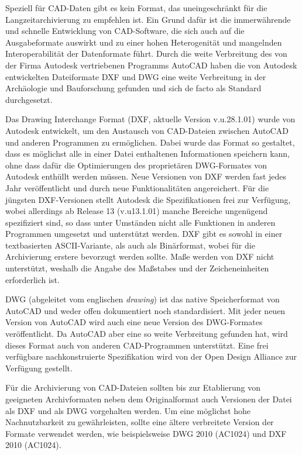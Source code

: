Speziell für CAD-Daten gibt es kein Format, das uneingeschränkt für die Langzeitarchivierung zu empfehlen ist. Ein Grund dafür ist die immerwährende und schnelle Entwicklung von CAD-Software, die sich auch auf die Ausgabeformate auswirkt und zu einer hohen Heterogenität und mangelnden Interoperabilität der Datenformate führt. Durch die weite Verbreitung des von der Firma Autodesk vertriebenen Programms AutoCAD haben die von Autodesk entwickelten Dateiformate DXF und DWG eine weite Verbreitung in der Archäologie und Bauforschung gefunden und sich de facto als Standard durchgesetzt.

Das Drawing Interchange Format (DXF, aktuelle Version v.u.28.1.01) wurde von Autodesk entwickelt, um den Austausch von CAD-Dateien zwischen AutoCAD und anderen Programmen zu ermöglichen. Dabei wurde das Format so gestaltet, dass es möglichst alle in einer Datei enthaltenen Informationen speichern kann, ohne dass dafür die Optimierungen des proprietären DWG-Formates von Autodesk enthüllt werden müssen. Neue Versionen von DXF werden fast jedes Jahr veröffentlicht und durch neue Funktionalitäten angereichert. Für die jüngsten DXF-Versionen stellt Autodesk die Spezifikationen frei zur Verfügung, wobei allerdings ab Release 13 (v.u13.1.01) manche Bereiche ungenügend spezifiziert sind, so dass unter Umständen nicht alle Funktionen in anderen Programmen umgesetzt und unterstützt werden. DXF gibt es sowohl in einer textbasierten ASCII-Variante, als auch als Binärformat, wobei für die Archivierung erstere bevorzugt werden sollte. Maße werden von DXF nicht unterstützt, weshalb die Angabe des Maßstabes und der Zeicheneinheiten erforderlich ist.

DWG (abgeleitet vom englischen \emph{drawing}) ist das native Speicherformat von AutoCAD und weder offen dokumentiert noch standardisiert. Mit jeder neuen Version von AutoCAD wird auch eine neue Version des DWG-Formates veröffentlicht. Da AutoCAD aber eine so weite Verbreitung gefunden hat, wird dieses Format auch von anderen CAD-Programmen unterstützt. Eine frei verfügbare nachkonstruierte Spezifikation wird von der Open Design Alliance zur Verfügung gestellt.

Für die Archivierung von CAD-Dateien sollten bis zur Etablierung von geeigneten Archivformaten neben dem Originalformat auch Versionen der Datei als DXF und als DWG vorgehalten werden. Um eine möglichst hohe Nachnutzbarkeit zu gewährleisten, sollte eine ältere verbreitete Version der Formate verwendet werden, wie beispielsweise DWG 2010 (AC1024) und DXF 2010 (AC1024). 

